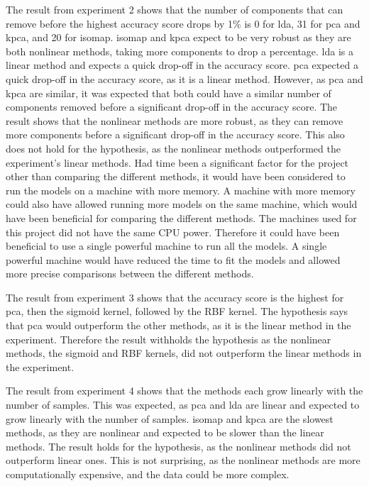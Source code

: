 The result from experiment 2 shows that the number of components that can remove before the highest accuracy score drops by 1\% is 0 for \gls{lda}, 31 for \gls{pca} and \gls{kpca}, and 20 for \gls{isomap}. \gls{isomap} and \gls{kpca} expect to be very robust as they are both nonlinear methods, taking more components to drop a percentage. \gls{lda} is a linear method and expects a quick drop-off in the accuracy score. \gls{pca} expected a quick drop-off in the accuracy score, as it is a linear method. However, as \gls{pca} and \gls{kpca} are similar, it was expected that both could have a similar number of components removed before a significant drop-off in the accuracy score. The result shows that the nonlinear methods are more robust, as they can remove more components before a significant drop-off in the accuracy score. This also does not hold for the hypothesis, as the nonlinear methods outperformed the experiment's linear methods. Had time been a significant factor for the project other than comparing the different methods, it would have been considered to run the models on a machine with more memory. A machine with more memory could also have allowed running more models on the same machine, which would have been beneficial for comparing the different methods. The machines used for this project did not have the same CPU power. Therefore it could have been beneficial to use a single powerful machine to run all the models. A single powerful machine would have reduced the time to fit the models and allowed more precise comparisons between the different methods.

The result from experiment 3 shows that the accuracy score is the highest for \gls{pca}, then the sigmoid kernel, followed by the RBF kernel. The hypothesis says that \gls{pca} would outperform the other methods, as it is the linear method in the experiment. Therefore the result withholds the hypothesis as the nonlinear methods, the sigmoid and RBF kernels, did not outperform the linear methods in the experiment. 

The result from experiment 4 shows that the methods each grow linearly with the number of samples. This was expected, as \gls{pca} and \gls{lda} are linear and expected to grow linearly with the number of samples. \gls{isomap} and \gls{kpca} are the slowest methods, as they are nonlinear and expected to be slower than the linear methods. The result holds for the hypothesis, as the nonlinear methods did not outperform linear ones. This is not surprising, as the nonlinear methods are more computationally expensive, and the data could be more complex.

